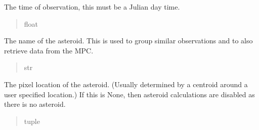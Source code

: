 \documentclass[letterpaper,11pt,english]{sphinxmanual}
\begin{document}
\begin{savenotes}
\begin{fulllineitems}
\begin{savenotes}\begin{fulllineitems}
\label{\detokenize{code/opihiexarata.opihi.solution:opihiexarata.opihi.solution.OpihiSolution.observing_time}}
\pysigstartsignatures
{}
\pysigstopsignatures
\sphinxAtStartPar
The time of observation, this must be a Julian day time.
\begin{quote}\begin{description}
\sphinxAtStartPar
float

\end{description}\end{quote}

\end{fulllineitems}\end{savenotes}


\begin{savenotes}\begin{fulllineitems}
\label{\detokenize{code/opihiexarata.opihi.solution:opihiexarata.opihi.solution.OpihiSolution.asteroid_name}}
\pysigstartsignatures
{}
\pysigstopsignatures
\sphinxAtStartPar
The name of the asteroid. This is used to group similar observations
and to also retrieve data from the MPC.
\begin{quote}\begin{description}
\sphinxAtStartPar
str

\end{description}\end{quote}

\end{fulllineitems}\end{savenotes}


\begin{savenotes}\begin{fulllineitems}
\label{\detokenize{code/opihiexarata.opihi.solution:opihiexarata.opihi.solution.OpihiSolution.asteroid_location}}
\pysigstartsignatures
{}
\pysigstopsignatures
\sphinxAtStartPar
The pixel location of the asteroid. (Usually determined by a centroid
around a user specified location.) If this is None, then asteroid
calculations are disabled as there is no asteroid.
\begin{quote}\begin{description}
\sphinxAtStartPar
tuple


\end{description}
\end{quote}
\end{fulllineitems}
\end{savenotes}
\end{fulllineitems}
\end{savenotes}
\end{document}
